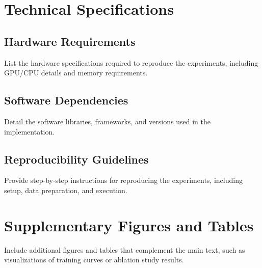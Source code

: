 \documentclass[
	english,
	ruledheaders=section,
	class=report,
	thesis={type=master},
	accentcolor=9c,
	custommargins=true,
	marginpar=false,
	parskip=half-,
	fontsize=11pt,
]{tudapub}
\begin{document}
\chapter{Technical Specifications}
\label{app:technical_specs}

\section{Hardware Requirements}
\label{app:hardware_requirements}
List the hardware specifications required to reproduce the experiments, including GPU/CPU details and memory requirements.

\section{Software Dependencies}
\label{app:software_dependencies}
Detail the software libraries, frameworks, and versions used in the implementation.

\section{Reproducibility Guidelines}
\label{app:reproducibility}
Provide step-by-step instructions for reproducing the experiments, including setup, data preparation, and execution.

\chapter{Supplementary Figures and Tables}
Include additional figures and tables that complement the main text, such as
visualizations of training curves or ablation study results.
\label{app:supplementary}
\end{document}
